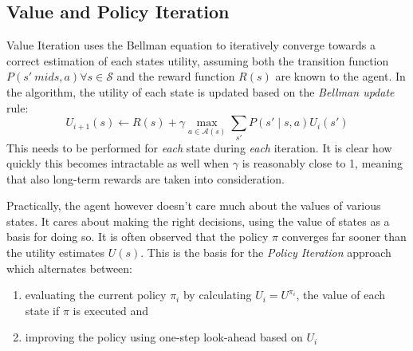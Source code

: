 



\subsection{Value and Policy Iteration}%
\label{sub:policy_and_value_iteration}

Value Iteration uses the Bellman equation to iteratively converge towards a correct estimation of each states utility,
assuming both the transition function $P(s' \ mid s,a) \forall s \in \mathcal{S}$ and the reward function $R(s)$ are
known to the agent.  
In the algorithm, the utility of each state is updated based on the \emph{Bellman update} rule:
\begin{equation}
U_{i+1}(s) \gets R(s) + \gamma \max_{a \in \mathcal{A}(s)} \sum_{s'}{P(s' \mid s,a) U_i(s')}
\end{equation}
This needs to be performed for \emph{each} state during \emph{each} iteration. It is clear how quickly this becomes
intractable as well when $\gamma$ is reasonably close to 1, meaning that also long-term rewards are taken into
consideration. 

Practically, the agent however doesn't care much about the values of various states. It cares about making the right
decisions, using the value of states as a basis for doing so. It is often observed that the policy $\pi$ converges far
sooner than the utility estimates $U(s)$. This is the basis for the \emph{Policy Iteration} approach which alternates
between: 
\begin{enumerate}
	\item evaluating the current policy $\pi_i$ by calculating $U_i=U^{\pi_i}$, the value of each state if $\pi$ is
	executed and 
	\item improving the policy using one-step look-ahead based on $U_i$
\end{enumerate}

